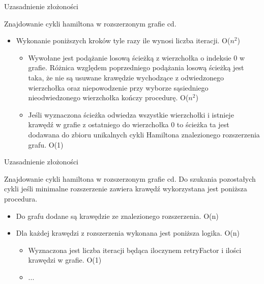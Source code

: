 \documentclass{beamer}
\begin{document}
\begin{frame}{Uzasadnienie złożoności}
\begin{block}{Znajdowanie cykli hamiltona w rozszerzonym grafie cd.}
\justifying
\begin{itemize}
    \item Wykonanie poniższych kroków tyle razy ile wynosi liczba iteracji. O($n^2$) \\
    \begin{itemize}
        \item Wywołane jest podążanie losową ścieżką z wierzchołka o indeksie 0 w grafie. Różnica względem poprzedniego podążania losową ścieżką jest taka, że nie są usuwane krawędzie wychodzące z odwiedzonego wierzchołka oraz niepowodzenie przy wyborze sąsiedniego nieodwiedzonego wierzchołka kończy procedurę. O($n^2$) \\
        \item Jeśli wyznaczona ścieżka odwiedza wszystkie wierzchołki i istnieje krawędź w grafie z ostatniego do wierzchołka 0 to ścieżka ta jest dodawana do zbioru unikalnych cykli Hamiltona znalezionego rozszerzenia grafu. O(1) \\ 
    \end{itemize}
\end{itemize}
\end{block}
\end{frame}

\begin{frame}{Uzasadnienie złożoności}
\begin{block}{Znajdowanie cykli hamiltona w rozszerzonym grafie cd.}
\justifying
Do szukania pozostałych cykli jeśli minimalne rozszerzenie zawiera krawędź wykorzystana jest poniższa procedura. 
\begin{itemize}
    \item Do grafu dodane są krawędzie ze znalezionego rozszerzenia. O(n) \\
    \item Dla każdej krawędzi z rozszerzenia wykonana jest poniższa logika. O(n) \\
    \begin{itemize}
        \item Wyznaczona jest liczba iteracji będąca iloczynem retryFactor i ilości krawędzi w grafie. O(1) \\
        \item ...
    \end{itemize}
    
\end{itemize}
\end{block}
\end{frame}
\end{document}
